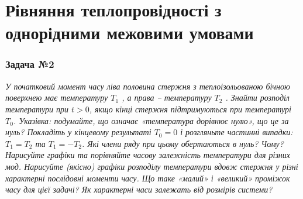 \documentclass[a4paper, 14pt]{extreport}
\begin{document}
\section{Рівняння теплопровідності з однорідними межовими умовами}

\subsubsection{Задача №2}

\textit{У початковий момент часу ліва половина стержня з теплоізольованою бічною поверхнею має температуру $T_1$ , а права -- температуру $T_2$ . Знайти розподіл температури при $t> 0$, якщо кінці стержня підтримуються при температурі $T_0$. Указівка: подумайте, що означає «температура дорівнює нулю», що це за нуль? Покладіть у кінцевому результаті $T_0 = 0$ і розгляньте частинні випадки: $T_1 = T_2$ та $T_1 = -T_2$. Які члени ряду при цьому обертаються в нуль? Чому? Нарисуйте графіки та порівняйте часову залежність температури для     різних мод. Нарисуйте (якісно) графіки розподілу     температури вдовж стержня у різні характерні послідовні моменти часу. Що таке «малий» і «великий» проміжок часу для цієї задачі? Як характерні часи залежать від розмірів системи?}
\end{document}
